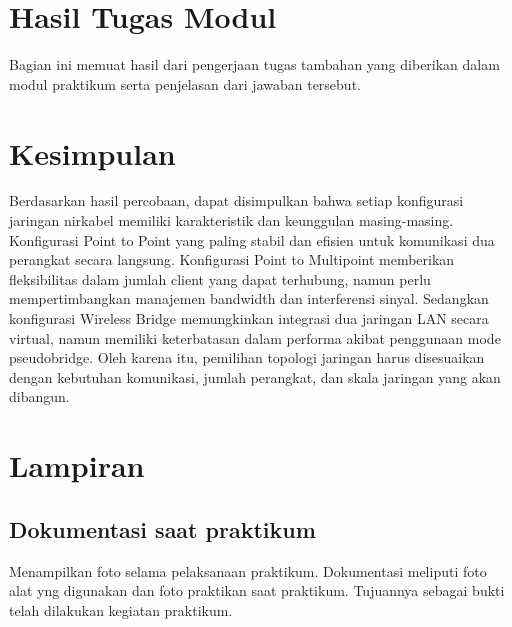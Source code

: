 \section{Hasil Tugas Modul}
Bagian ini memuat hasil dari pengerjaan tugas tambahan yang diberikan dalam modul praktikum serta penjelasan dari jawaban tersebut. 

\section{Kesimpulan}
Berdasarkan hasil percobaan, dapat disimpulkan bahwa setiap konfigurasi jaringan nirkabel memiliki 
karakteristik dan keunggulan masing-masing. Konfigurasi Point to Point yang paling stabil 
dan efisien untuk komunikasi dua perangkat secara langsung. Konfigurasi Point to Multipoint 
memberikan fleksibilitas dalam jumlah client yang dapat terhubung, namun perlu mempertimbangkan 
manajemen bandwidth dan interferensi sinyal. Sedangkan konfigurasi Wireless Bridge memungkinkan 
integrasi dua jaringan LAN secara virtual, namun memiliki keterbatasan dalam performa akibat 
penggunaan mode pseudobridge. Oleh karena itu, pemilihan topologi jaringan harus disesuaikan dengan 
kebutuhan komunikasi, jumlah perangkat, dan skala jaringan yang akan dibangun.

\section{Lampiran}
\subsection{Dokumentasi saat praktikum}
Menampilkan foto selama pelaksanaan praktikum. Dokumentasi meliputi foto alat yng digunakan dan foto praktikan saat praktikum. Tujuannya sebagai bukti telah dilakukan kegiatan praktikum.

